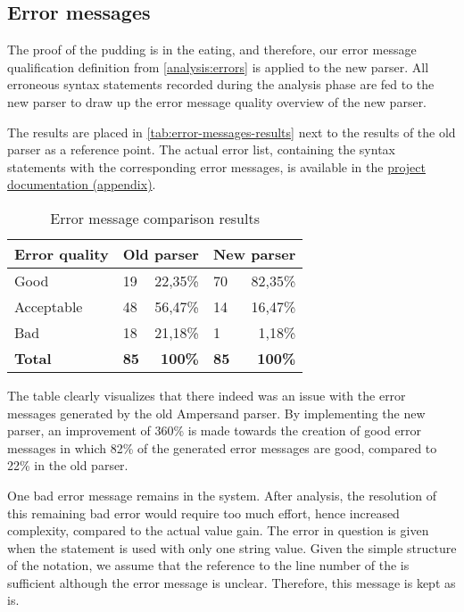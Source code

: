 
\subsection{Error messages}
\label{tests:errors}
The proof of the pudding is in the eating, and therefore, our error message qualification definition from \autoref{analysis:errors} is applied to the new parser.
All erroneous syntax statements recorded during the analysis phase are fed to the new parser to draw up the error message quality overview of the new parser.

The results are placed in \autoref{tab:error-messages-results} next to the results of the old parser as a reference point.
The actual error list, containing the syntax statements with the corresponding error messages, is available in the \hyperref[app:docs]{project documentation (appendix)}.

\begin{table}[h]
  \centering\small
	\begin{tabular}{|l|lr|lr|}\hline
		\rowcolor[HTML]{DDDDDD}
    \textbf{Error quality}  & \multicolumn{2}{|c|}{\textbf{Old parser}} & \multicolumn{2}{|c|}{\textbf{New parser}} \\\hline\hline
		Good           & 19          & 22,35\%          & 70          & 82,35\%          \\\hline
		Acceptable        & 48          & 56,47\%          & 14          & 16,47\%          \\\hline
		Bad            & 18          & 21,18\%          & 1           &  1,18\%          \\\hline
		\rowcolor[HTML]{DDDDDD}\hline\hline
		\textbf{Total} & \textbf{85} & \textbf{100\%} & \textbf{85} & \textbf{100\%} \\\hline
	\end{tabular}
  \caption{Error message comparison results}
  \label{tab:error-messages-results}
\end{table}

The table clearly visualizes that there indeed was an issue with the error messages generated by the old Ampersand parser.
By implementing the new parser, an improvement of 360\% is made towards the creation of good error messages in which 82\% of the generated error messages are good, compared to 22\% in the old parser.

One bad error message remains in the system.
After analysis, the resolution of this remaining bad error would require too much effort, hence increased complexity, compared to the actual value gain.
The error in question is given when the  statement is used with only one string value. 
Given the simple structure of the notation, we assume that the reference to the line number of the  is sufficient although the error message is unclear.
Therefore, this message is kept as is.

